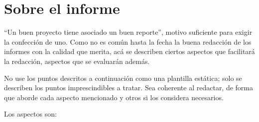 \documentclass[10pt]{article}
\begin{document}
	
	\section*{Sobre el informe}
	
		``Un buen proyecto tiene asociado un buen reporte'', motivo suficiente para exigir la confección de uno. Como no es común hasta la fecha la buena redacción de los informes con la calidad que merita, acá se describen ciertos aspectos que facilitará la redacción, aspectos que se evaluarán además. 
		
		No use los puntos descritos a continuación como una plantilla estática; solo se describen los puntos imprescindibles a tratar. Sea coherente al redactar, de forma que aborde cada aspecto mencionado y otros si los considera necesarios. 
		
		Los aspectos son:
\end{document}
